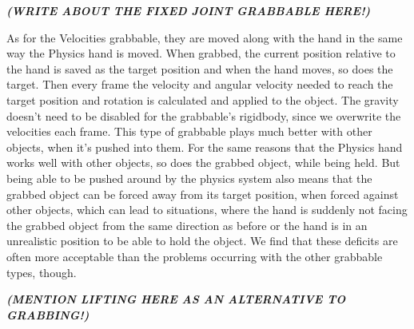 \textbf{\textit{(WRITE ABOUT THE FIXED JOINT GRABBABLE HERE!)}}

As for the Velocities grabbable, they are moved along with the hand in the same way the Physics hand is moved. When grabbed, the current position relative to the hand is saved as the target position and when the hand moves, so does the target. Then every frame the velocity and angular velocity needed to reach the target position and rotation is calculated and applied to the object. The gravity doesn't need to be disabled for the grabbable's rigidbody, since we overwrite the velocities each frame. This type of grabbable plays much better with other objects, when it's pushed into them. For the same reasons that the Physics hand works well with other objects, so does the grabbed object, while being held. But being able to be pushed around by the physics system also means that the grabbed object can be forced away from its target position, when forced against other objects, which can lead to situations, where the hand is suddenly not facing the grabbed object from the same direction as before or the hand is in an unrealistic position to be able to hold the object. We find that these deficits are often more acceptable than the problems occurring with the other grabbable types, though.


\textbf{\textit{(MENTION LIFTING HERE AS AN ALTERNATIVE TO GRABBING!)}}
